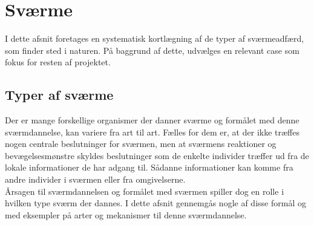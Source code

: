 \section{Sværme}
I dette afsnit foretages en systematisk kortlægning af de typer af sværmeadfærd, som finder sted i naturen. På baggrund af dette, udvælges en relevant case som fokus for resten af projektet. 


\subsection{Typer af sværme}
Der er mange forskellige organismer der danner sværme og formålet med denne sværmdannelse, kan variere fra art til art. Fælles for dem er, at der ikke træffes nogen centrale beslutninger for sværmen, men at sværmens reaktioner og bevægelsesmønstre skyldes beslutninger som de enkelte individer træffer ud fra de lokale informationer de har adgang til. Sådanne informationer kan komme fra andre individer i sværmen eller fra omgivelserne. \\
Årsagen til sværmdannelsen og formålet med sværmen spiller dog en rolle i hvilken type sværm der dannes. I dette afsnit gennemgås nogle af disse formål og med eksempler på arter og mekanismer til denne sværmdannelse.

